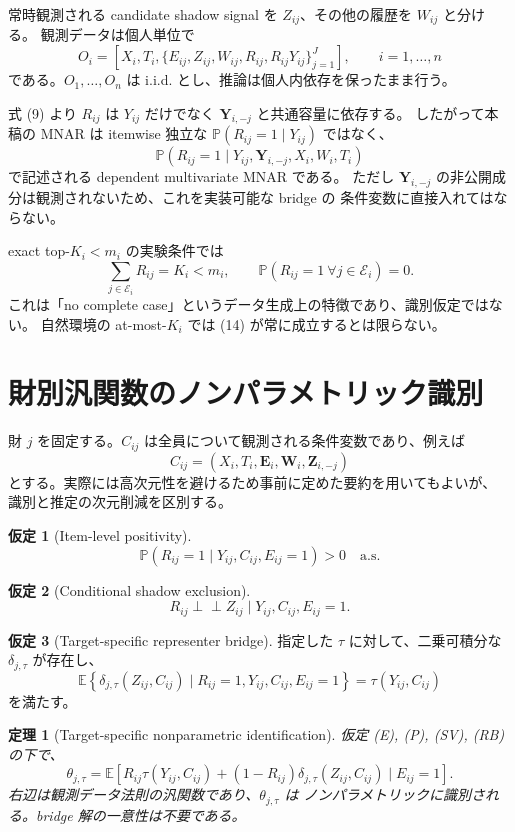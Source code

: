 \documentclass[a4paper,11pt]{ltjsarticle}
\newcommand{\E}{\mathbb E}
\newcommand{\Prb}{\mathbb P}
\newcommand{\indep}{\mathrel{\perp\!\!\!\perp}}
\newcommand{\1}{\mathbf 1}
\newcommand{\cE}{\mathcal E}
\theoremstyle{definition}
\newtheorem{assumption}{仮定}
\theoremstyle{plain}
\newtheorem{theorem}{定理}
\theoremstyle{remark}
\begin{document}
常時観測される candidate shadow signal を $Z_{ij}$、その他の履歴を $W_{ij}$ と分ける。
観測データは個人単位で
\[
 O_i=\left[
 X_i,T_i,\{E_{ij},Z_{ij},W_{ij},R_{ij},R_{ij}Y_{ij}\}_{j=1}^J
 \right],
 \qquad i=1,\ldots,n
 \tag{12}
\]
である。$O_1,\ldots,O_n$ は i.i.d. とし、推論は個人内依存を保ったまま行う。

式 (9) より $R_{ij}$ は $Y_{ij}$ だけでなく $\bm Y_{i,-j}$ と共通容量に依存する。
したがって本稿の MNAR は itemwise 独立な
$\Prb(R_{ij}=1\mid Y_{ij})$ ではなく、
\[
 \Prb(R_{ij}=1\mid Y_{ij},\bm Y_{i,-j},X_i,W_i,T_i)
 \tag{13}
\]
で記述される dependent multivariate MNAR である。
ただし $\bm Y_{i,-j}$ の非公開成分は観測されないため、これを実装可能な bridge の
条件変数に直接入れてはならない。

exact top-$K_i<m_i$ の実験条件では
\[
 \sum_{j\in\cE_i}R_{ij}=K_i<m_i,
 \qquad
 \Prb(R_{ij}=1\ \forall j\in\cE_i)=0.
 \tag{14}
\]
これは「no complete case」というデータ生成上の特徴であり、識別仮定ではない。
自然環境の at-most-$K_i$ では (14) が常に成立するとは限らない。

\section{財別汎関数のノンパラメトリック識別}

財 $j$ を固定する。$C_{ij}$ は全員について観測される条件変数であり、例えば
\[
 C_{ij}=(X_i,T_i,\bm E_i,\bm W_i,\bm Z_{i,-j})
 \tag{15}
\]
とする。実際には高次元性を避けるため事前に定めた要約を用いてもよいが、
識別と推定の次元削減を区別する。

\begin{assumption}[Item-level positivity]
\[
 \Prb(R_{ij}=1\mid Y_{ij},C_{ij},E_{ij}=1)>0
 \quad\text{a.s.}
 \tag{P}
\]
\end{assumption}

\begin{assumption}[Conditional shadow exclusion]
\[
 R_{ij}\indep Z_{ij}\mid Y_{ij},C_{ij},E_{ij}=1.
 \tag{SV}
\]
\end{assumption}

\begin{assumption}[Target-specific representer bridge]
指定した $\tau$ に対して、二乗可積分な $\delta_{j,\tau}$ が存在し、
\[
 \E\left\{
 \delta_{j,\tau}(Z_{ij},C_{ij})
 \mid R_{ij}=1,Y_{ij},C_{ij},E_{ij}=1
 \right\}
 =\tau(Y_{ij},C_{ij})
 \tag{RB}
\]
を満たす。
\end{assumption}

\begin{theorem}[Target-specific nonparametric identification]
仮定 (E), (P), (SV), (RB) の下で、
\[
 \boxed{
 \theta_{j,\tau}
 =\E\left[
 R_{ij}\tau(Y_{ij},C_{ij})
 +(1-R_{ij})\delta_{j,\tau}(Z_{ij},C_{ij})
 \mid E_{ij}=1
 \right].}
 \tag{16}
\]
右辺は観測データ法則の汎関数であり、$\theta_{j,\tau}$ は
ノンパラメトリックに識別される。bridge 解の一意性は不要である。
\end{theorem}
\end{document}
